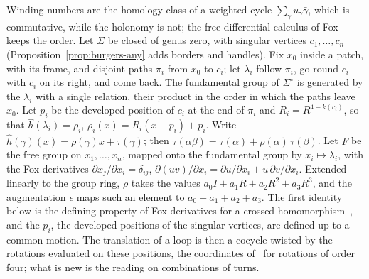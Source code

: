 \documentclass[11pt,a4paper]{article}
\begin{document}
Winding numbers are the homology class of a weighted cycle $\sum_\gamma
u_\gamma \bar\gamma$, which is commutative, while the holonomy is not; the
free differential calculus of Fox~\cite{fox1953free} keeps the order. Let
$\Sigma$ be closed of genus zero, with singular vertices $c_1, \dots, c_n$
(Proposition~\ref{prop:burgers-any} adds borders and handles). Fix $x_0$ inside
a patch, with its frame, and disjoint paths $\pi_i$ from $x_0$ to $c_i$; let
$\lambda_i$ follow $\pi_i$, go round $c_i$ with $c_i$ on its right, and come
back. The fundamental group of $\Sigma^\circ$ is generated by the $\lambda_i$
with a single relation, their product in the order in which the paths leave
$x_0$. Let $p_i$ be the developed position of $c_i$ at the end of $\pi_i$ and
$R_i = R^{4 - k(c_i)}$, so that $\hat h(\lambda_i) = \rho_i$, $\rho_i(x) =
R_i(x - p_i) + p_i$. Write $\hat h(\gamma)(x) = \rho(\gamma)x + \tau(\gamma)$;
then $\tau(\alpha\beta) = \tau(\alpha) + \rho(\alpha)\,\tau(\beta)$. Let $F$
be the free group on $x_1, \dots, x_n$, mapped onto the fundamental group by
$x_i \mapsto \lambda_i$, with the Fox derivatives $\partial x_j/\partial x_i =
\delta_{ij}$, $\partial(uv)/\partial x_i = \partial u/\partial x_i +
u\,\partial v/\partial x_i$. Extended linearly to the group ring, $\rho$ takes
the values $a_0 I + a_1 R + a_2 R^2 + a_3 R^3$, and the augmentation $\epsilon$
maps such an element to $a_0 + a_1 + a_2 + a_3$. The first identity below is
the defining property of Fox derivatives for a crossed
homomorphism~\cite{fox1953free}, and the $p_i$, the developed positions of
the singular vertices, are defined up to a common motion. The translation of
a loop is then a cocycle twisted by the rotations evaluated on these
positions, the coordinates of~\cite{thurston1998shapes} for rotations of
order four; what is new is the reading on combinations of turns.
\end{document}
